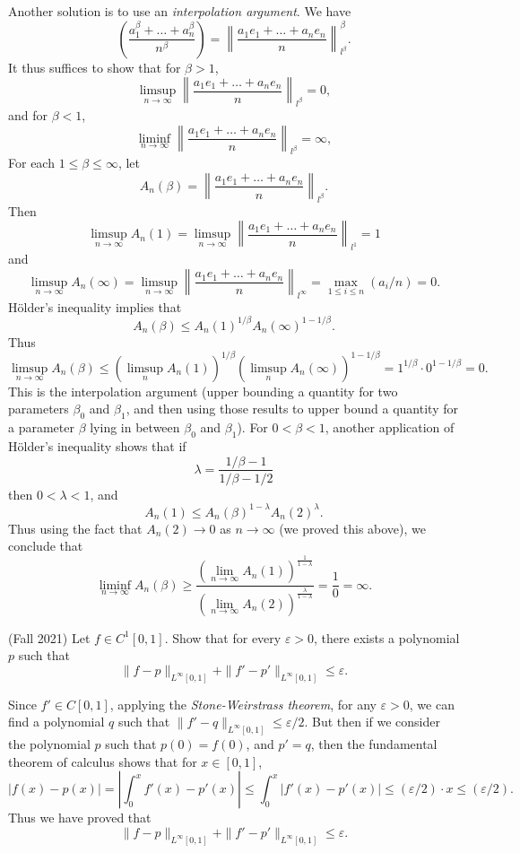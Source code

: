 \documentclass{exam}
\theoremstyle{problemstyle}
\newcommand{\1}[1]{\textbf{1}_{\left[#1\right]}} %
\begin{document}
\begin{questions}
\begin{parts}
\begin{solution}
		Another solution is to use an \emph{interpolation argument}. We have
		\[ \left( \frac{a_1^\beta + \dots + a_n^\beta}{n^\beta} \right) = \left\| \frac{a_1e_1 + \dots + a_ne_n}{n} \right\|_{l^\beta}^\beta. \]
		It thus suffices to show that for $\beta > 1$,
		\[ \limsup_{n \to \infty} \left\| \frac{a_1e_1 + \dots + a_ne_n}{n} \right\|_{l^\beta} = 0, \]
		and for $\beta < 1$,
		\[ \liminf_{n \to \infty} \left\| \frac{a_1e_1 + \dots + a_ne_n}{n} \right\|_{l^\beta} = \infty, \]
		For each $1 \leq \beta \leq \infty$, let
		\[ A_n(\beta) = \left\| \frac{a_1e_1 + \dots + a_ne_n}{n} \right\|_{l^\beta}. \]
		Then
		\[ \limsup_{n \to \infty} A_n(1) = \limsup_{n \to \infty} \left\| \frac{a_1e_1 + \dots + a_ne_n}{n} \right\|_{l^1} = 1 \]
		and
		\[ \limsup_{n \to \infty} A_n(\infty) = \limsup_{n \to \infty} \left\| \frac{a_1e_1 + \dots + a_ne_n}{n} \right\|_{l^\infty} = \max_{1 \leq i \leq n}(a_i/n) = 0. \]
		H\"{o}lder's inequality implies that
		\[ A_n(\beta) \leq A_n(1)^{1/\beta} A_n(\infty)^{1-1/\beta}. \]
		Thus
		\[ \limsup_{n \to \infty} A_n(\beta) \leq (\limsup_n A_n(1))^{1/\beta} (\limsup_n A_n(\infty))^{1 - 1/\beta} = 1^{1/\beta} \cdot 0^{1 - 1/\beta} = 0. \]
		This is the interpolation argument (upper bounding a quantity for two parameters $\beta_0$ and $\beta_1$, and then using those results to upper bound a quantity for a parameter $\beta$ lying in between $\beta_0$ and $\beta_1$). For $0 < \beta < 1$, another application of H\"{o}lder's inequality shows that if
		\[ \lambda = \frac{1/\beta - 1}{1/\beta - 1/2} \]
		then $0 < \lambda < 1$, and
		\[ A_n(1) \leq A_n(\beta)^{1-\lambda} A_n(2)^\lambda. \]
		Thus using the fact that $A_n(2) \to 0$ as $n \to \infty$ (we proved this above), we conclude that
		\[ \liminf_{n \to \infty} A_n(\beta) \geq \frac{\left( \lim_{n \to \infty} A_n(1) \right)^{\frac{1}{1 - \lambda}}}{\left( \lim_{n \to \infty} A_n(2) \right)^{\frac{\lambda}{1 - \lambda}}} = \frac{1}{0} = \infty. \]
	\end{solution}
\end{parts}


\question (Fall 2021) Let $f \in C^1[0,1]$. Show that for every $\varepsilon > 0$, there exists a polynomial $p$ such that
%
\[ \| f - p \|_{L^\infty[0,1]} + \| f' - p' \|_{L^\infty[0,1]} \leq \varepsilon. \]
\begin{solution}
	Since $f' \in C[0,1]$, applying the \emph{Stone-Weirstrass theorem}, for any $\varepsilon > 0$, we can find a polynomial $q$ such that $\| f' - q \|_{L^\infty[0,1]} \leq \varepsilon / 2$. But then if we consider the polynomial $p$ such that $p(0) = f(0)$, and $p' = q$, then the fundamental theorem of calculus shows that for $x \in [0,1]$,
	\[ |f(x) - p(x)| = \left| \int_0^x f'(x) - p'(x) \right| \leq \int_0^x |f'(x) - p'(x)| \leq (\varepsilon / 2) \cdot x \leq (\varepsilon/2). \]
	Thus we have proved that
	\[ \| f - p \|_{L^\infty[0,1]} + \| f' - p' \|_{L^\infty[0,1]} \leq \varepsilon. \]
\end{solution}
   

\end{questions}
\end{document}

